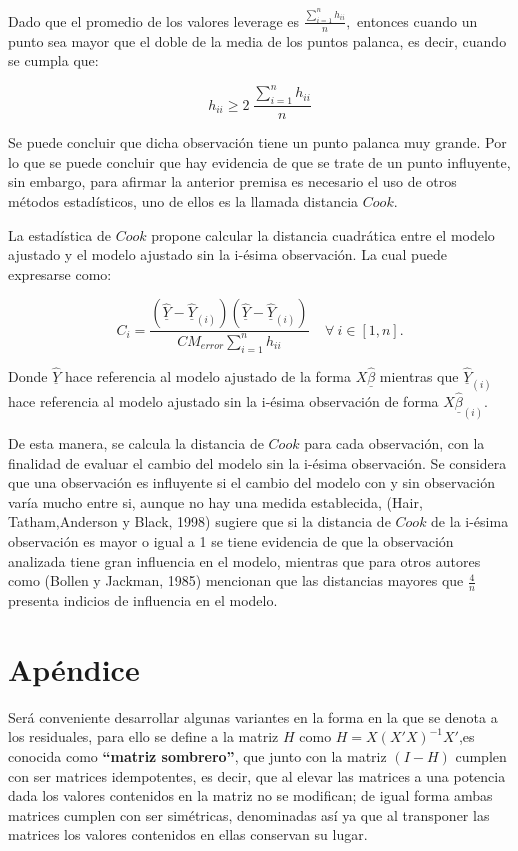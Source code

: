 \documentclass[a4paper,oneside,openany]{book}
\begin{document}
Dado que el promedio de los valores leverage es
\(\frac{\sum_{i=1}^{n}h_{ii}}{n},\) entonces cuando un punto sea mayor
que el doble de la media de los puntos palanca, es decir, cuando se
cumpla que:

\[h_{ii} \geq  2 \ \frac{\sum_{i=1}^{n}h_{ii}}{n}\]

Se puede concluir que dicha observación tiene un punto palanca muy
grande. Por lo que se puede concluir que hay evidencia de que se trate
de un punto influyente, sin embargo, para afirmar la anterior premisa es
necesario el uso de otros métodos estadísticos, uno de ellos es la
llamada distancia \(Cook.\)

La estadística de \(Cook\) propone calcular la distancia cuadrática
entre el modelo ajustado y el modelo ajustado sin la i-ésima
observación. La cual puede expresarse como:

\[C_{i}=\frac{\left(\underline{\hat{Y}}-\underline{\hat{Y}}_{(i)}\right)\left(\underline{\hat{Y}}-\underline{\hat{Y}}_{(i)}\right)}{CM_{error}\sum_{i=1}^{n}h_{ii}} \ \ \ \ \  \forall \ i \in [1,n].\]

Donde \(\underline{\hat{Y}}\) hace referencia al modelo ajustado de la
forma \(X\underline{\hat{\beta}}\) mientras que
\(\underline{\hat{Y}}_{(i)}\) hace referencia al modelo ajustado sin la
i-ésima observación de forma \(X\underline{\hat{\beta}}_{(i)}\).

De esta manera, se calcula la distancia de \(Cook\) para cada
observación, con la finalidad de evaluar el cambio del modelo sin la
i-ésima observación. Se considera que una observación es influyente si
el cambio del modelo con y sin observación varía mucho entre si, aunque
no hay una medida establecida, (Hair, Tatham,Anderson y Black, 1998)
sugiere que si la distancia de \(Cook\) de la i-ésima observación es
mayor o igual a 1 se tiene evidencia de que la observación analizada
tiene gran influencia en el modelo, mientras que para otros autores como
(Bollen y Jackman, 1985) mencionan que las distancias mayores que
\(\frac{4}{n}\) presenta indicios de influencia en el modelo.

\chapter{Apéndice}\label{apuxe9ndice}

Será conveniente desarrollar algunas variantes en la forma en la que se
denota a los residuales, para ello se define a la matriz \(H\) como
\(H=X(X'X)^{-1}X'\),es conocida como \textbf{``matriz sombrero''}, que
junto con la matriz \((I-H)\) cumplen con ser matrices idempotentes, es
decir, que al elevar las matrices a una potencia dada los valores
contenidos en la matriz no se modifican; de igual forma ambas matrices
cumplen con ser simétricas, denominadas así ya que al transponer las
matrices los valores contenidos en ellas conservan su lugar.
\end{document}
